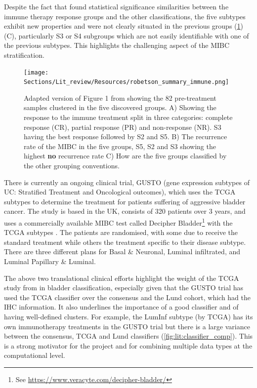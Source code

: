 Despite the fact that \citeauthor{Robertson2023-na} found statistical significance similarities between the immune therapy response groups and the other classifications, the five subtypes exhibit new properties and were not clearly situated in the previous groups (\cref{fig:lit:immune_rob}) (C), particularly S3 or S4 subgroups which are not easily identifiable with one of the previous subtypes. This highlights the challenging aspect of the MIBC stratification.


\begin{figure}[!htb]    
    \centering
    \texttt{[image: Sections/Lit\_review/Resources/robetson\_summary\_immune.png]}
    \caption[MIBC subtypes based on the response to immunotherapy]{Adapted version of Figure 1 from \cite{Robertson2023-na} showing the 82 pre-treatment samples clustered in the five discovered groups. A) Showing the response to the immune treatment split in three categories: complete response (CR), partial response (PR) and non-response (NR). S3 having the best response followed by S2 and S5. B) The recurrence rate of the MIBC in the five groups, S5, S2 and S3 showing the highest \textbf{no} recurrence rate C) How are the five groups classified by the other grouping conventions.}
    \label{fig:lit:immune_rob}
\end{figure}


There is currently an ongoing clinical trial, GUSTO (gene expression subtypes of \gls{UC}: Stratified Treatment and Oncological outcomes), which uses the TCGA subtypes to determine the treatment for patients suffering of aggressive bladder cancer. The study is based in the UK, consists of 320 patients over 3 years, and uses a commercially available MIBC test called Decipher Bladder\footnote{See \url{https://www.veracyte.com/decipher-bladder/}} with the TCGA subtypes \citep{Griffin2024-zr}. The patients are randomised, with some  due to receive the standard treatment while others the treatment specific to their disease subtype. There are three different plans for Basal \& Neuronal, Luminal infiltrated, and Luminal Papillary \& Luminal.

The above two translational clinical efforts highlight the weight of the TCGA study from \citet{Robertson2017-mg} in bladder classification, especially given that the GUSTO trial has used the TCGA classifier over the consensus and the Lund cohort, which had the IHC information. It also underlines the importance of a good classifier and of having well-defined clusters. For example, the LumInf subtype (by TCGA) has its own immunotherapy treatments in the GUSTO trial but there is a large variance between the consensus, TCGA and Lund classifiers (\cref{fig:lit:classifier_comp}). This is a strong motivator for the project and for combining multiple data types at the computational level.



